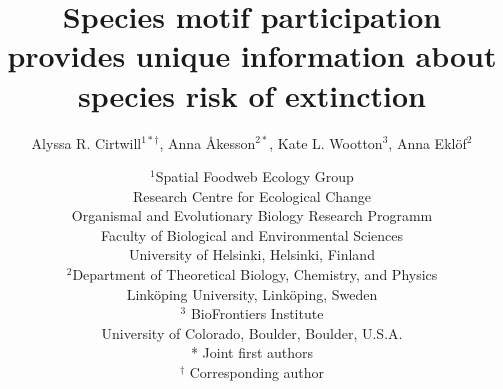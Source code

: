 \documentclass[12pt]{article}
\begin{document}
 

\title{Species motif participation provides unique information about species risk of extinction}

\author{Alyssa R. Cirtwill$^{1*\dagger}$, Anna \r{A}kesson$^{2*}$, Kate L. Wootton$^{3}$, Anna Ekl\"{o}f$^{2}$} 
\date{
\small$^1$Spatial Foodweb Ecology Group\\
Research Centre for Ecological Change\\
Organismal and Evolutionary Biology Research Programm\\
Faculty of Biological and Environmental Sciences\\
University of Helsinki, Helsinki, Finland\\
\medskip
\small$^2$Department of Theoretical Biology, Chemistry, and Physics\\ 
Link\"{o}ping University, Link\"{o}ping, Sweden\\
\medskip
\small$^3$ BioFrontiers Institute\\
University of Colorado, Boulder, Boulder, U.S.A.\\
\medskip
* Joint first authors\\
\medskip
$^\dagger$ Corresponding author\\
}


\maketitle 
\raggedright
\end{document}
